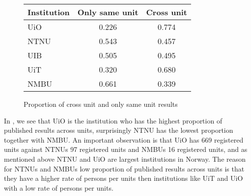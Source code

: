 \begin{figure}[h]
	\centering
	\begin{tabular}{| l || c | c |}
		\hline
		Institution	& Only same unit	& Cross unit	\\ \hline
		UiO		& 0.226			& 0.774		\\
		NTNU		& 0.543			& 0.457		\\
		UIB		& 0.505			& 0.495		\\
		UiT		& 0.320			& 0.680		\\
		NMBU		& 0.661			& 0.339		\\
		\hline
	\end{tabular}
	\caption{Proportion of cross unit and only same unit results}
	\label{tab:unit-proportion}
\end{figure}

In , we see that UiO is the institution who has the highest proportion of published results across units, surprisingly NTNU has the lowest proportion together with NMBU. An important observation is that UiO has 669 registered units against NTNUs 97 registered units and NMBUs 16 registered units, and as mentioned above NTNU and UiO are largest institutions in Norway. The reason for NTNUs and NMBUs low proportion of published results across units is that they have a higher rate of persons per units then institutions like UiT and UiO with a low rate of persons per units.
